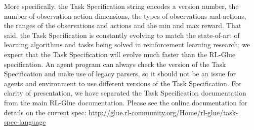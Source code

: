 \documentclass[11pt]{article}
\begin{document}
More specifically, the Task Specification string encodes a version number, the number of observation action dimensions, the types of observations and actions, the ranges of the observations and actions and the min and max reward. That said, the Task Specification is constantly evolving to match the state-of-art of learning algorithms and tasks being solved in reinforcement learning research; we expect that the Task Specification will evolve much faster than the RL-Glue specification. An agent program can always check the version of the Task Specification and make use of legacy parsers, so it should not be an issue for agents and environment to use different versions of the Task Specification. For clarity of presentation, we have separated the Task Specification documentation from the main RL-Glue documentation. Please see the online documentation for details on the current spec: \url{http://glue.rl-community.org/Home/rl-glue/task-spec-language} 
%
\end{document}
